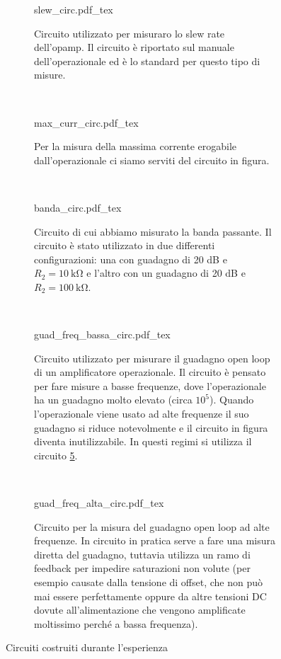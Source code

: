 \begin{figure*}[b!]
        \centering
        \small
        \begin{subfigure}[b]{0.32\textwidth}
            \def\svgwidth{\columnwidth}
            {slew_circ.pdf_tex}
            \caption{Circuito utilizzato per misuraro lo slew rate dell'opamp. Il circuito è
		riportato sul manuale dell'operazionale ed è lo standard per questo tipo di misure.}
            \label{fig:slew_circ3}
        \end{subfigure}
        ~
        \begin{subfigure}[b]{0.32\textwidth}
            \def\svgwidth{\columnwidth}
            {max_curr_circ.pdf_tex}
            \caption{Per la misura della massima corrente erogabile dall'operazionale ci siamo
		serviti del circuito in figura.}
            \label{fig:max_curr_circ3}
        \end{subfigure}
        ~
        \begin{subfigure}[b]{0.32\textwidth}
            \def\svgwidth{\columnwidth}
            {banda_circ.pdf_tex}
            \caption{Circuito di cui abbiamo misurato la banda passante. Il circuito è stato utilizzato
		in due differenti configurazioni: una con guadagno di 20 dB e $R_2 = \SI{10}{\kilo\ohm}$
		e l'altro con un guadagno di 20 dB e $R_2 = \SI{100}{\kilo\ohm}$.}
            \label{fig:banda_circ3}
        \end{subfigure}
        ~
        \begin{subfigure}[b]{0.48\textwidth}
            \centering
            \def\svgwidth{0.8\columnwidth}
	    \vspace{0.5cm}
            {guad_freq_bassa_circ.pdf_tex}
	    \vspace{0pt}
            \caption{Circuito utilizzato per misurare il guadagno open loop di un amplificatore
		operazionale. Il circuito è pensato per fare misure a basse frequenze, dove
		l'operazionale ha un guadagno molto elevato (circa $10^5$). Quando l'operazionale viene
		usato ad alte frequenze il suo guadagno si riduce notevolmente e il circuito in figura
		diventa inutilizzabile. In questi regimi si utilizza il circuito \ref{fig:gain_high_circ3}.}
            \label{fig:gain_low_circ3}
        \end{subfigure}
        ~
        \begin{subfigure}[b]{0.48\textwidth}
            \centering
            \def\svgwidth{0.8\columnwidth}
            {guad_freq_alta_circ.pdf_tex}
	    \vspace{0pt}
            \caption{Circuito per la misura del guadagno open loop ad alte frequenze. In circuito in pratica
		serve a fare una misura diretta del guadagno, tuttavia utilizza un ramo di feedback per impedire
		saturazioni non volute (per esempio causate dalla tensione di offset, che non può mai essere
		perfettamente oppure da altre tensioni DC dovute all'alimentazione che vengono amplificate moltissimo
		perché a bassa frequenza).}
            \label{fig:gain_high_circ3}
        \end{subfigure}

        \caption{Circuiti costruiti durante l'esperienza}
        \label{fig:circuits3}
\end{figure*}
